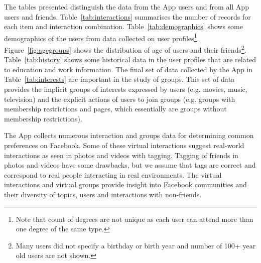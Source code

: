 The tables presented distinguish the data from the App users and from
all App users and friends. Table~\ref{tab:interactions}
summarises the number of records for each item and interaction
combination. Table~\ref{tab:demographics} shows some demographics of
the users from data collected on user profiles\footnote{Note that
count of degrees are not unique as each user can attend more than one
degree of the same type.}. Figure~\ref{fig:agegroups} shows the distribution of age of
users and their friends\footnote{Many users did not specify a birthday or birth year and number of 100+ year old users are not shown.}. Table~\ref{tab:history} shows some historical
data in the user profiles that are related to education and work information. The final
set of data collected by the App in Table~\ref{tab:interests} are
important in the study of groups. This set of data provides the
implicit groups of interests expressed by users (e.g. movies,
music, television) and the explicit actions of users to join groups (e.g. groups
with membership restrictions and pages, which essentially are groups
without membership restrictions).

The App collects numerous interaction and groups data for determining common preferences on Facebook. Some of these virtual interactions suggest real-world interactions as seen in photos and videos with tagging. Tagging of friends in photos and videos have some drawbacks, but we assume that tags are correct and correspond to real people interacting in real environments. The virtual interactions and virtual groups provide insight into Facebook communities and their diversity of topics, users and interactions with non-friends.


